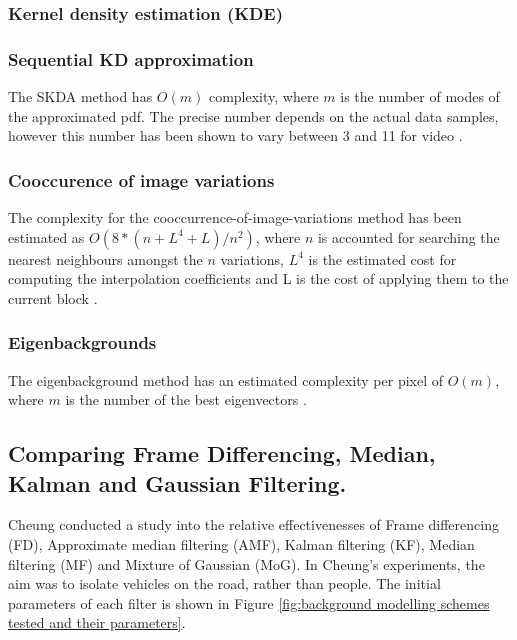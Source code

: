 \subsubsection{Kernel density estimation (KDE)}


\subsubsection{Sequential KD approximation}

The SKDA method has $O(m)$ complexity, where $m$ is the number of modes of
the approximated pdf. 
The precise number depends on the actual data samples, however this number has been shown to vary between 3 and 11 for video \cite{Han2007}.\\

\subsubsection{Cooccurence of image variations}

The complexity for the cooccurrence-of-image-variations method has been
estimated as $O(8*(n+L^4+L)/n^2)$, where $n$ is accounted for searching the nearest neighbours amongst the $n$ variations, $L^4$ is the estimated cost for computing the interpolation coefficients and L is the cost of applying them to the current block \cite{Piccardi2004}.\\

\subsubsection{Eigenbackgrounds}

The eigenbackground method has an estimated complexity per pixel of $O(m)$, where $m$ is the number of the best eigenvectors \cite{Piccardi2004}.\\

\subsection{Comparing Frame Differencing, Median, Kalman and Gaussian Filtering.}
Cheung \cite{Cheung2007} conducted a study into the relative effectivenesses of Frame differencing (FD), Approximate median filtering (AMF), Kalman filtering (KF), Median filtering (MF) and Mixture of Gaussian (MoG). In Cheung's experiments, the aim was to isolate vehicles on the road, rather than people. The initial parameters of each filter is shown in Figure \ref{fig:background modelling schemes tested and their parameters}.\\

